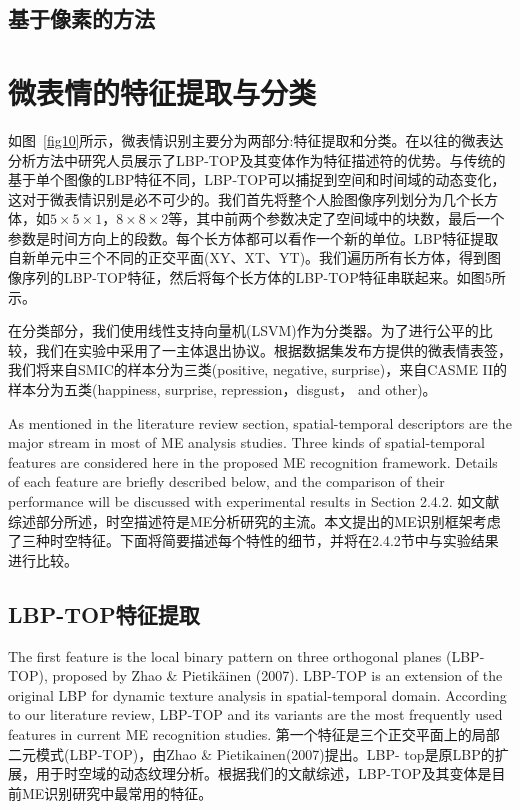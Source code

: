 \subsection{基于像素的方法}


\section{微表情的特征提取与分类}

如图~\ref{fig10}所示，微表情识别主要分为两部分:特征提取和分类。在以往的微表达分析方法中研究人员展示了LBP-TOP及其变体作为特征描述符的优势。与传统的基于单个图像的LBP特征不同，LBP-TOP可以捕捉到空间和时间域的动态变化，这对于微表情识别是必不可少的。我们首先将整个人脸图像序列划分为几个长方体，如$ 5\times5\times1 $，$ 8\times8\times2 $等，其中前两个参数决定了空间域中的块数，最后一个参数是时间方向上的段数。每个长方体都可以看作一个新的单位。LBP特征提取自新单元中三个不同的正交平面(XY、XT、YT)。我们遍历所有长方体，得到图像序列的LBP-TOP特征，然后将每个长方体的LBP-TOP特征串联起来。如图5所示。

在分类部分，我们使用线性支持向量机(LSVM)作为分类器\citep{chang2011libsvm}。为了进行公平的比较，我们在实验中采用了一主体退出协议。根据数据集发布方提供的微表情表签，我们将来自SMIC的样本分为三类(positive, negative, surprise)，来自CASME II的样本分为五类(happiness, surprise, repression，disgust， and other)。

As mentioned in the literature review section, spatial-temporal descriptors are the major stream in most of ME analysis studies. Three kinds of spatial-temporal features are considered here in the proposed ME recognition framework. Details of each feature are briefly described below, and the comparison of their performance will be discussed with experimental results in Section 2.4.2.
如文献综述部分所述，时空描述符是ME分析研究的主流。本文提出的ME识别框架考虑了三种时空特征。下面将简要描述每个特性的细节，并将在2.4.2节中与实验结果进行比较。

\subsection{LBP-TOP特征提取}

The first feature is the local binary pattern on three orthogonal planes (LBP-TOP), proposed by Zhao \& Pietikäinen (2007). LBP-TOP is an extension of the original LBP for dynamic texture analysis in spatial-temporal domain. According to our literature review, LBP-TOP and its variants are the most frequently used features in current ME recognition studies.
第一个特征是三个正交平面上的局部二元模式(LBP-TOP)，由Zhao \& Pietikainen(2007)提出。LBP- top是原LBP的扩展，用于时空域的动态纹理分析。根据我们的文献综述，LBP-TOP及其变体是目前ME识别研究中最常用的特征。

